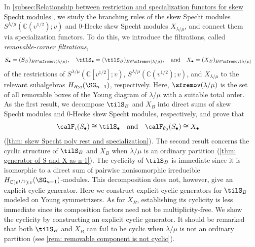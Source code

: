 \documentclass[12pt, reqno]{amsart}
\theoremstyle{plain}
\theoremstyle{definition}
\numberwithin{equation}{section}
\numberwithin{figure}{section}
\numberwithin{table}{section}
\def\C{\mathbb C}
\begin{document}
In \cref{subsec:Relationship between restriction and specialization functors for skew Specht modules}, we study  the branching rules of the skew Specht modules $S^{\lambda/\mu}(\C(v^{1/2});v)$ and $0$-Hecke skew Specht modules $X_{\lambda/\mu}$, and connect them via specialization functors.
To do this, we introduce the  filtrations, called \emph{removable-corner filtrations},
\[
S_\bullet = (S_B)_{B \in \sfremov(\lambda/\mu)}, \quad \tilS_\bullet = (\tilS_B)_{B \in \sfremov(\lambda/\mu)}, \quad\text{and}\quad X_\bullet = (X_B)_{B \in \sfremov(\lambda/\mu)}
\]
of the restrictions of $S^{\lambda/\mu}(\C[v^{1/2}];v)$, $S^{\lambda/\mu}(\C(v^{1/2});v)$, and $X_{\lambda/\mu}$ to the relevant  subalgebras $H_{R;a}(\SG_{n-1})$, respectively.
Here, $\sfremov(\lambda/\mu)$ is the set of all removable boxes of the Young diagram of $\lambda/\mu$ with a suitable total order.
As the first result,
we decompose $\tilS_B$ and $X_B$ into direct sums of skew Specht modules and $0$-Hecke skew Specht modules, respectively, and prove that
\[
\calF_{\iota}(S_\bullet) \cong \tilS_\bullet
\quad \text{and} \quad
\calF_{\theta_0}(S_\bullet) \cong X_\bullet
\]
 (\cref{thm: skew Specht poly rest and specialization}).
The second result concerns the cyclic structure of $\tilS_B$ and $X_B$ when $\lambda/\mu$ is an ordinary partition (\cref{thm: generator of S and X as n-1}).
The cyclicity of $\tilS_B$ is immediate since it is isomorphic to a direct sum of pairwise nonisomorphic irreducible $H_{\C(v^{1/2});v}(\SG_{n-1})$-modules.
This decomposition does not, however, give an explicit cyclic generator. Here we construct explicit cyclic generators for $\tilS_B$ modeled on Young symmetrizers.
As for $X_B$, establishing its cyclicity is less immediate since its composition factors need not be multiplicity-free.  
We show the cyclicity by constructing an explicit cyclic generator.
It should be remarked that both $\tilS_B$ and $X_B$ can fail to be cyclic when $\lambda/\mu$ is not an ordinary partition (see \cref{rem: removable component is not cyclic}).


 
\end{document}
